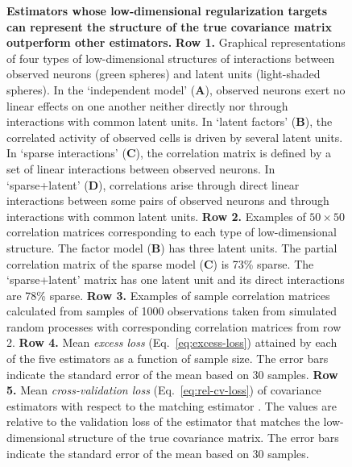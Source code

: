 \documentclass[10pt]{article}
\begin{document}
\begin{figure}[!ht]
    \begin{center}
    \end{center}
    \caption{{\bf Estimators whose low-dimensional regularization targets can represent the structure of the true covariance matrix outperform other estimators.}
        {\bf Row 1.} Graphical representations of four types of low-dimensional structures of interactions between observed neurons (green spheres) and latent units (light-shaded spheres).
        In the `independent model' ({\bf A}), observed neurons exert no linear effects on one another neither directly nor through interactions with common latent units. 
        In `latent factors' ({\bf B}), the correlated activity of observed cells is driven by several latent units. 
        In `sparse interactions' ({\bf C}), the correlation matrix is defined by a set of linear interactions between observed neurons. 
        In `sparse+latent' ({\bf D}), correlations arise through direct linear interactions between some pairs of observed neurons and through interactions with common latent units. 
        {\bf Row 2.} Examples of $50\times 50$ correlation matrices corresponding to each type of low-dimensional structure. 
        The factor model ({\bf B}) has three latent units. 
        The partial correlation matrix of the sparse model ({\bf C}) is 73\% sparse.
        The `sparse+latent' matrix has one latent unit and its direct interactions are 78\% sparse.
        {\bf Row 3.} Examples of sample correlation matrices calculated from samples of 1000 observations taken from simulated random processes with corresponding correlation matrices from row 2.
        {\bf Row 4.} Mean \emph{excess loss} (Eq.~\ref{eq:excess-loss}) attained by each of the five estimators as a function of sample size. The error bars indicate the standard error of the mean based on 30 samples.
        {\bf Row 5.} Mean \emph{cross-validation loss} (Eq.~\ref{eq:rel-cv-loss}) of covariance estimators with respect to the matching estimator . The values are relative to the validation loss of the estimator that matches the low-dimensional structure of the true covariance matrix. The error bars indicate the standard error of the mean based on 30 samples.
    }
    \label{fig:02}
\end{figure} 
\end{document}
